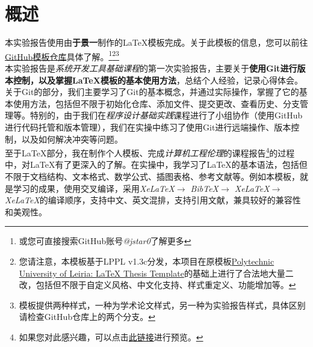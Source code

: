 \thispagestyle{plain} %
\chapter*{概述} %
\label{cp:abstract}

本实验报告使用由\textbf{于景一}制作的\LaTeX{}模板完成。关于此模板的信息，您可以前往\href{https://github.com/jstar0/LaTeXTemplate/}{GitHub模板仓库}具体了解。\footnote{或您可直接搜索GitHub账号\textit{@jstar0}了解更多}\footnote{您请注意，本模板基于LPPL v1.3c分发，本项目在原模板\href{https://github.com/joseareia/ipleiria-thesis}{Polytechnic University of Leiria: LaTeX Thesis Template}的基础上进行了合法地大量二改，包括但不限于自定义风格、中文化支持、样式重定义、功能增加等。}\footnote{模板提供两种样式，一种为学术论文样式，另一种为实验报告样式，具体区别请检查GitHub仓库上的两个分支。}\\

本实验报告是\textit{系统开发工具基础课程}的第一次实验报告，主要关于\textbf{使用Git进行版本控制，以及掌握\LaTeX{}模板的基本使用方法}，总结个人经验，记录心得体会。 \\

关于Git的部分，我们主要学习了Git的基本概念，并通过实际操作，掌握了它的基本使用方法，包括但不限于初始化仓库、添加文件、提交更改、查看历史、分支管理等。特别的，由于我们在\textit{程序设计基础实践}课程进行了小组协作（使用GitHub进行代码托管和版本管理），我们在实操中练习了使用Git进行远端操作、版本控制，以及如何解决冲突等问题。\\

至于\LaTeX{}部分，我在制作个人模板、完成\textit{计算机工程伦理}的课程报告\footnote{如果您对此感兴趣，可以点击\href{https://xinera-my.sharepoint.com/:b:/g/personal/i_mcxin_top/EZ0DMB5suB5Dgu74rP2IwnsBF8CHPOEvkMRq40TBv-3rSQ?e=dU1OTj}{此链接}进行预览。}的过程中，对\LaTeX{}有了更深入的了解。在实操中，我学习了\LaTeX{}的基本语法，包括但不限于文档结构、文本格式、数学公式、插图表格、参考文献等。例如本模板，就是学习的成果，使用交叉编译，采用\textit{XeLaTeX$\rightarrow$ BibTeX$\rightarrow$ XeLaTeX$\rightarrow$ XeLaTeX}的编译顺序，支持中文、英文混排，支持引用文献，兼具较好的兼容性和美观性。\\

